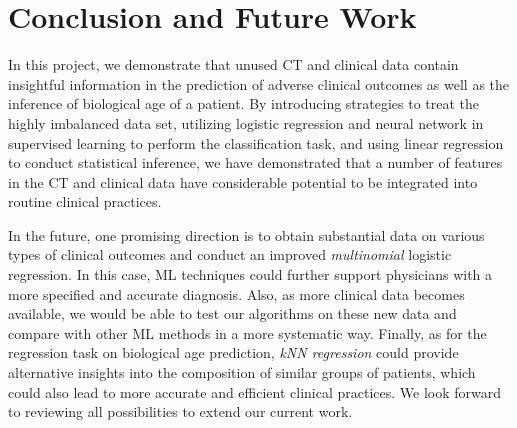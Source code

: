 \documentclass{article}
\begin{document}
\section{Conclusion and Future Work}
In this project, we demonstrate that unused CT and clinical data contain insightful information in the prediction of adverse clinical outcomes as well as the inference of biological age of a patient. By introducing strategies to treat the highly imbalanced data set, utilizing logistic regression and neural network in supervised learning to perform the classification task, and using linear regression to conduct statistical inference, we have demonstrated that a number of features in the CT and clinical data have considerable potential to be integrated into routine clinical practices. 

In the future, one promising direction is to obtain substantial data on various types of clinical outcomes and conduct an improved \textit{multinomial} logistic regression. In this case, ML techniques could further support physicians with a more specified and accurate diagnosis. Also, as more clinical data becomes available, we would be able to test our algorithms on these new data and compare with other ML methods in a more systematic way. Finally, as for the regression task on biological age prediction, \textit{kNN regression} could provide alternative insights into the composition of similar groups of patients, which could also lead to more accurate and efficient clinical practices. We look forward to reviewing all possibilities to extend our current work.



\end{document}
